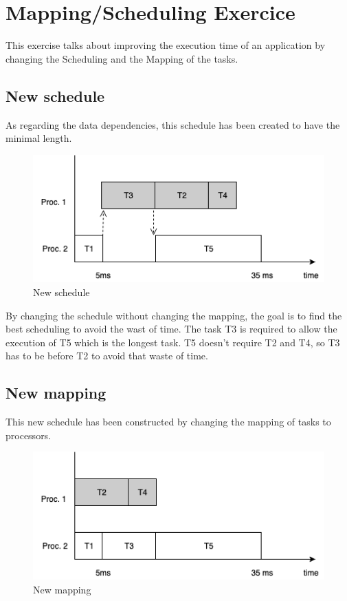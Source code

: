 \section{Mapping/Scheduling Exercice}

This exercise talks about improving the execution time of an application by changing the Scheduling and the Mapping of the tasks.

\subsection{New schedule}

As regarding the data dependencies, this schedule has been created to have the minimal length.

\bigskip

\begin{figure}[h!]
  \includegraphics[width=\textwidth]{Ass3_1.png}
  \caption{New schedule}
  \label{fig:sys}
\end{figure}

By changing the schedule without changing the mapping, the goal is to find the best scheduling to avoid the wast of time.
The task T3 is required to allow the execution of T5 which is the longest task. T5 doesn't require T2 and T4, so T3 has to be before T2 to avoid that waste of time.

\newpage\subsection{New mapping}

This new schedule has been constructed by changing the mapping of tasks to processors. 

\bigskip

\begin{figure}[h!]
  \includegraphics[width=\textwidth]{Ass3_2.png}
  \caption{New mapping}
  \label{fig:sys}
\end{figure}


